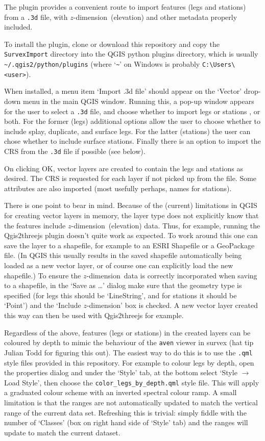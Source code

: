 \documentclass[]{article}
\newcommand{\zdimension}{$z$-dimension}
\begin{document}
The plugin provides a convenient route to import features (legs and
stations) from a \verb}.3d} file, with \zdimension\ (elevation) and
other metadata properly included.

To install the plugin, clone or download this repository and copy the
\verb}SurvexImport} directory into the QGIS python plugins directory,
which is usually \verb}~/.qgis2/python/plugins} (where
`\verb}~}' on Windows is probably
\verb}C:\Users\<user>}).

When installed, a menu item `Import .3d file' should appear on the
`Vector' drop-down menu in the main QGIS window. Running this, a pop-up
window appears for the user to select a \verb}.3d} file, and choose
whether to import legs or stations , or both. For the former (legs)
additional options allow the user to choose whether to include splay,
duplicate, and surface legs. For the latter (stations) the user can
chose whether to include surface stations. Finally there is an option to
import the CRS from the \verb}.3d} file if possible (see below).

On clicking OK, vector layers are created to contain the legs and
stations as desired. The CRS is requested for each layer if not picked
up from the file. Some attributes are also imported (most usefully
perhaps, names for stations).

There is one point to bear in mind. Because of the (current) limitations
in QGIS for creating vector layers in memory, the layer type does not
explicitly know that the features include \zdimension\ (elevation) data.
Thus, for example, running the Qgis2threejs plugin doesn't quite work as
expected. To work around this one can save the layer to a shapefile, for
example to an ESRI Shapefile or a GeoPackage file. (In QGIS this usually
results in the saved shapefile automatically being loaded as a new
vector layer, or of course one can explicitly load the new shapefile.)
To ensure the \zdimension\ data is correctly incorporated when saving to
a shapefile, in the `Save as \dots' dialog make sure that the
geometry type is specified (for legs this should be `LineString', and
for stations it should be `Point') and the `Include \zdimension' box is
checked. A new vector layer created this way can then be used with
Qgis2threejs for example.

Regardless of the above, features (legs or stations) in the created
layers can be coloured by depth to mimic the behaviour of the
\verb}aven} viewer in survex (hat tip Julian Todd for figuring this
out). The easiest way to do this is to use the \verb}.qml} style files
provided in this repository. For example to colour legs by depth, open
the properties dialog and under the `Style' tab, at the bottom select
`Style $\rightarrow$ Load Style', then choose the
\verb}color_legs_by_depth.qml} style file. This will apply a
graduated colour scheme with an inverted spectral colour ramp. A small
limitation is that the ranges are not automatically updated to match the
vertical range of the current data set. Refreshing this is trivial:
simply fiddle with the number of `Classes' (box on right hand side of
`Style' tab) and the ranges will update to match the current dataset.
\end{document}
